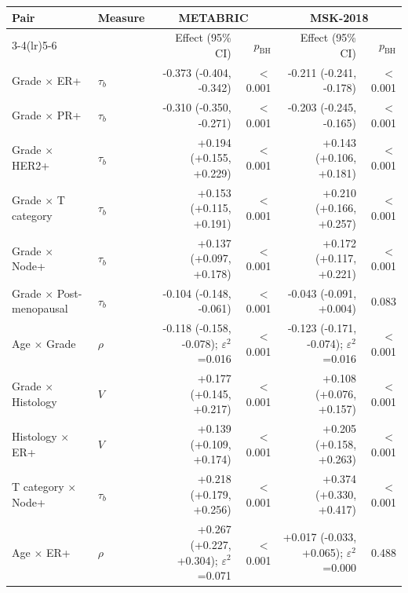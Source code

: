\begin{tabular}{llrrrr}
\toprule
Pair & Measure & \multicolumn{2}{c}{METABRIC} & \multicolumn{2}{c}{MSK-2018} \\
\cmidrule(lr){3-4}\cmidrule(lr){5-6}
 & & Effect (95\% CI) & $p_\mathrm{BH}$ & Effect (95\% CI) & $p_\mathrm{BH}$ \\
\midrule
Grade $\times$ ER+ & $\tau_b$ & -0.373 (-0.404, -0.342) & $<$0.001 & -0.211 (-0.241, -0.178) & $<$0.001 \\
Grade $\times$ PR+ & $\tau_b$ & -0.310 (-0.350, -0.271) & $<$0.001 & -0.203 (-0.245, -0.165) & $<$0.001 \\
Grade $\times$ HER2+ & $\tau_b$ & +0.194 (+0.155, +0.229) & $<$0.001 & +0.143 (+0.106, +0.181) & $<$0.001 \\
Grade $\times$ T category & $\tau_b$ & +0.153 (+0.115, +0.191) & $<$0.001 & +0.210 (+0.166, +0.257) & $<$0.001 \\
Grade $\times$ Node+ & $\tau_b$ & +0.137 (+0.097, +0.178) & $<$0.001 & +0.172 (+0.117, +0.221) & $<$0.001 \\
Grade $\times$ Post-menopausal & $\tau_b$ & -0.104 (-0.148, -0.061) & $<$0.001 & -0.043 (-0.091, +0.004) & 0.083 \\
Age $\times$ Grade & $\rho$ & -0.118 (-0.158, -0.078); $\varepsilon^2$=0.016 & $<$0.001 & -0.123 (-0.171, -0.074); $\varepsilon^2$=0.016 & $<$0.001 \\
Grade $\times$ Histology & $V$ & +0.177 (+0.145, +0.217) & $<$0.001 & +0.108 (+0.076, +0.157) & $<$0.001 \\
Histology $\times$ ER+ & $V$ & +0.139 (+0.109, +0.174) & $<$0.001 & +0.205 (+0.158, +0.263) & $<$0.001 \\
T category $\times$ Node+ & $\tau_b$ & +0.218 (+0.179, +0.256) & $<$0.001 & +0.374 (+0.330, +0.417) & $<$0.001 \\
Age $\times$ ER+ & $\rho$ & +0.267 (+0.227, +0.304); $\varepsilon^2$=0.071 & $<$0.001 & +0.017 (-0.033, +0.065); $\varepsilon^2$=0.000 & 0.488 \\
\bottomrule
\end{tabular}